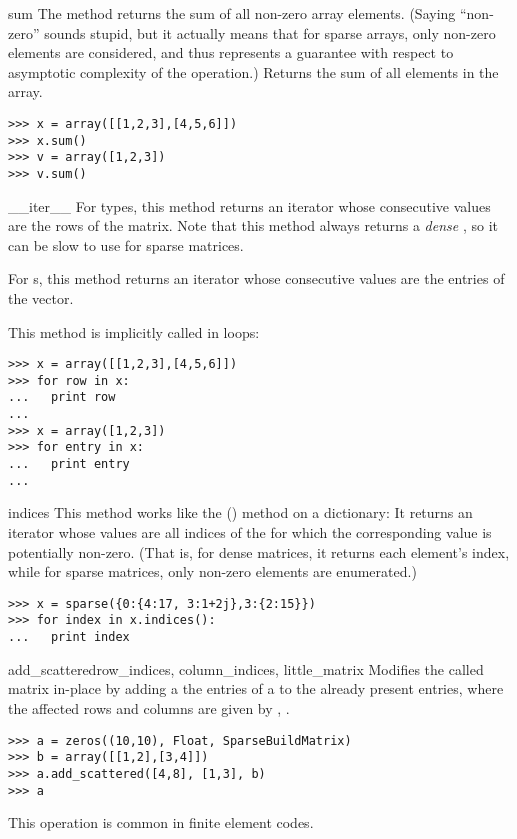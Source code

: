 \begin{methoddesc}{sum}{}
  The  method returns the sum of all non-zero array elements. (Saying
  ``non-zero'' sounds stupid, but it actually means that for sparse arrays,
  only non-zero elements are considered, and thus represents a guarantee
  with respect to asymptotic complexity of the operation.)
  Returns the sum of all elements in the array.
\begin{verbatim}
>>> x = array([[1,2,3],[4,5,6]])
>>> x.sum()
>>> v = array([1,2,3])
>>> v.sum()
\end{verbatim}
\end{methoddesc}
\begin{methoddesc}{__iter__}{}
  For  types, this method returns an iterator whose
  consecutive values are the rows of the matrix. Note that this method
  always returns a \emph{dense} , so it can be slow
  to use for sparse matrices.

  For s, this method returns an iterator whose
  consecutive values are the entries of the vector.

  This method is implicitly called in  loops:
\begin{verbatim}
>>> x = array([[1,2,3],[4,5,6]])
>>> for row in x:
...   print row
...
>>> x = array([1,2,3])
>>> for entry in x:
...   print entry
...
\end{verbatim}
\end{methoddesc}
\begin{methoddesc}{indices}{}
  This method works like the () method on a
  dictionary: It returns an iterator whose values are all indices
  of the  for which the corresponding value is
  potentially non-zero. (That is, for dense matrices, it returns
  each element's index, while for sparse matrices, only non-zero
  elements are enumerated.)
\begin{verbatim}
>>> x = sparse({0:{4:17, 3:1+2j},3:{2:15}})
>>> for index in x.indices():
...   print index
\end{verbatim}
\end{methoddesc}
\begin{methoddesc}{add_scattered}{row_indices, column_indices, little_matrix}
  Modifies the called matrix in-place by adding a the entries of a
   to the already present entries, where the
  affected rows and columns are given by ,
  .
\begin{verbatim}
>>> a = zeros((10,10), Float, SparseBuildMatrix)
>>> b = array([[1,2],[3,4]])
>>> a.add_scattered([4,8], [1,3], b)
>>> a
\end{verbatim}
  This operation is common in finite element codes.
\end{methoddesc}

